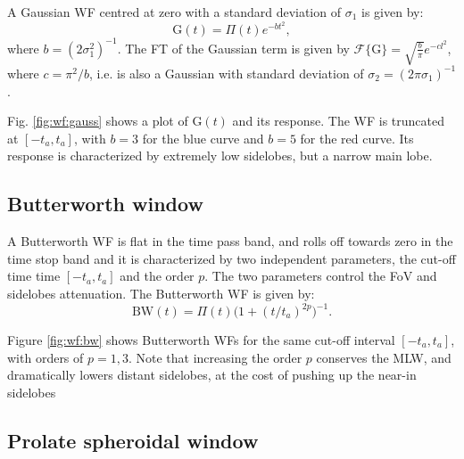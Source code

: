 \documentclass[useAMS,usenatbib]{mn2e}
\begin{document}

A Gaussian WF centred at zero with a standard deviation of $\sigma_1$ is given by: 
\begin{equation}
\mathrm{G}(t)= \Pi(t) e^{-bt^{2}}, \label{eq:gauss}
\end{equation}
where $b=(2\sigma_1^2)^{-1}$. The FT of the Gaussian term is given by 
$\mathcal{F}\big\{\mathrm{G}\big\}=\sqrt{\frac{b}{\pi}}e^{-cl^2}$, where $c=\pi^2/b$, i.e.
is also a Gaussian with standard deviation of $\sigma_2= (2\pi\sigma_1)^{-1}$.

Fig. \ref{fig:wf:gauss} shows a plot of $\mathrm{G}(t)$ and its response. The WF is truncated at $[-t_a,t_a]$, with $b = 3$ for the blue curve and $b=5$ for the red curve. Its response is characterized by extremely low sidelobes, but a narrow main lobe.

\subsection{Butterworth window}


A Butterworth WF is flat in the time pass band, and rolls off towards zero in the time stop band and it is 
characterized by two independent parameters, the cut-off time time $[-t_a,t_a]$ and the order $p$. 
The two parameters control the 
FoV and sidelobes attenuation. The Butterworth WF is given by:
\begin{equation}
\mathrm{BW}(t)= \Pi(t) \Big(1 + (t/t_a)^{2p}\Big)^{-1}.
\end{equation}

Figure \ref{fig:wf:bw} shows Butterworth WFs for the same cut-off interval $[-t_a,t_a]$, with orders of $p=1,3$. Note that increasing 
the order $p$ conserves the MLW, and dramatically lowers distant sidelobes, at the cost of pushing up the near-in sidelobes

\subsection{Prolate spheroidal window}

\end{document}
